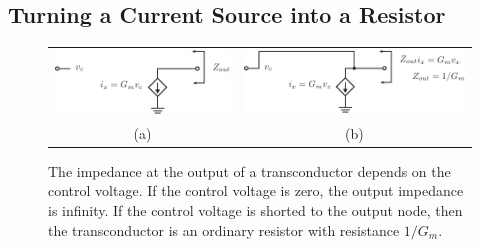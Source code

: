 \subsection{Turning a Current Source into a Resistor}
\begin{figure}[tb]
\begin{center}
\begin{tabular}{cc}
\includegraphics[width=.4\columnwidth]{tia_zout} &
\includegraphics[width=.4\columnwidth]{tia_zout_fb} \\
(a) & (b) \\
\end{tabular}
\end{center}
\caption{The impedance at the output of a transconductor depends on the control voltage. If the control voltage is zero, the output impedance is infinity.  If the control voltage is shorted to the output node, then the transconductor is an ordinary resistor with resistance $1/G_m$.}
\label{fig:tia_zout}
\end{figure}

